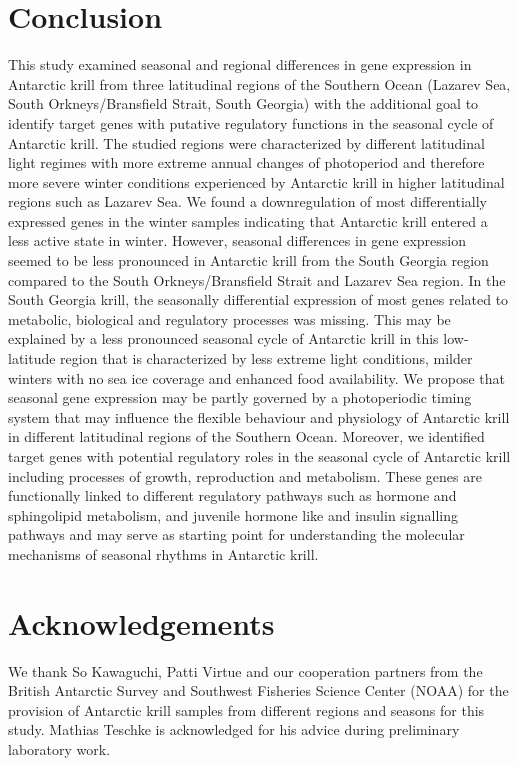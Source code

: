 \section{Conclusion}
This study examined seasonal and regional differences in gene expression in
Antarctic krill from three latitudinal regions of the Southern Ocean (Lazarev
Sea, South Orkneys/Bransfield Strait, South Georgia) with the additional goal
to identify target genes with putative regulatory functions in the seasonal
cycle of Antarctic krill. The studied regions were characterized by different
latitudinal light regimes with more extreme annual changes of photoperiod and
therefore more severe winter conditions experienced by Antarctic krill in
higher latitudinal regions such as Lazarev Sea. We found a downregulation of
most differentially expressed genes in the winter samples indicating that
Antarctic krill entered a less active state in winter. However, seasonal
differences in gene expression seemed to be less pronounced in Antarctic krill
from the South Georgia region compared to the South Orkneys/Bransfield Strait
and Lazarev Sea region. In the South Georgia krill, the seasonally differential
expression of most genes related to metabolic, biological and regulatory
processes was missing. This may be explained by a less pronounced seasonal
cycle of Antarctic krill in this low-latitude region that is characterized by
less extreme light conditions, milder winters with no sea ice coverage and
enhanced food availability. We propose that seasonal gene expression may be
partly governed by a photoperiodic timing system that may influence the
flexible behaviour and physiology of Antarctic krill in different latitudinal
regions of the Southern Ocean. Moreover, we identified target genes with
potential regulatory roles in the seasonal cycle of Antarctic krill including
processes of growth, reproduction and metabolism. These genes are functionally
linked to different regulatory pathways such as hormone and sphingolipid
metabolism, and juvenile hormone like and insulin signalling pathways and may
serve as starting point for understanding the molecular mechanisms of seasonal
rhythms in Antarctic krill.

\section{Acknowledgements}
We thank So Kawaguchi, Patti Virtue and our cooperation partners from the
British Antarctic Survey and Southwest Fisheries Science Center (NOAA) for the
provision of Antarctic krill samples from different regions and seasons for
this study. Mathias Teschke is acknowledged for his advice during preliminary
laboratory work.

